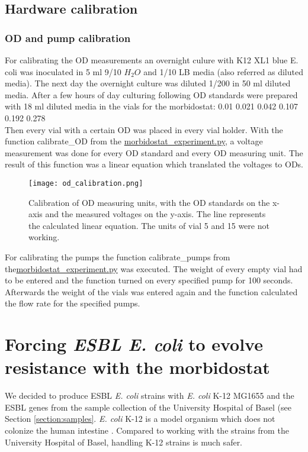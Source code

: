\subsection{Hardware calibration}
\subsubsection{OD and pump calibration}
For calibrating the OD measurements an overnight culure with K12 XL1 blue E. coli was inoculated in 5 ml 9/10 $H_2O$ and 1/10 LB media (also referred as diluted media). The next day the overnight culture was diluted 1/200 in 50 ml diluted media. After a few hours of day culturing following OD standards were prepared with 18 ml diluted media in the vials for the morbidostat: 0.01 0.021 0.042 0.107 0.192 0.278\\
Then every vial with a certain OD was placed in every vial holder. With the function calibrate\_OD from the \href{https://github.com/nahanoo/ESBL\_project/}{morbidostat\_experiment.py}, a voltage measurement was done for every OD standard and every OD measuring unit. The result of this function was a linear equation which translated the voltages to ODs. \\
\begin{figure}
	\texttt{[image: od\_calibration.png]}
	\caption{Calibration of OD measuring units, with the OD standards on the x-axis and the measured voltages on the y-axis. The line represents the calculated linear equation. The units of vial 5 and 15 were not working.}
\end{figure}
For calibrating the pumps the function calibrate\_pumps from the\href{https://github.com/nahanoo/ESBL\_project/}{morbidostat\_experiment.py} was executed. The weight of every empty vial had to be entered and the function turned on every specified pump for 100 seconds. Afterwards the weight of the vials was entered again and the function calculated the flow rate for the specified pumps. 
\label{section:OD_calibration}

\section{Forcing \textit{ESBL E. coli} to evolve resistance with the morbidostat}
We decided to produce ESBL \textit{E. coli} strains with \textit{E. coli} K-12 MG1655 and the ESBL genes from the sample collection of the University Hospital of Basel (see Section \ref{section:samples}. \textit{E. coli} K-12 is a model organism which does not colonize the human intestine \cite{k-12}. Compared to working with the strains from the University Hospital of Basel, handling K-12 strains is much safer.  

